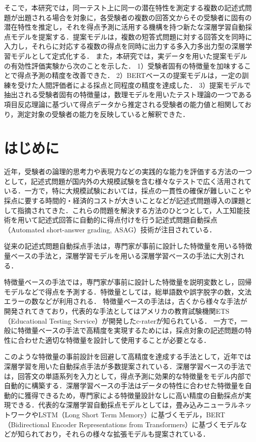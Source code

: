 \documentclass[a4paper,12pt,oneside,openany]{jsbook}
\begin{document}
そこで，本研究では，同一テスト上に同一の潜在特性を測定する複数の記述式問題が出題される場合を対象に，各受験者の複数の回答文からその受験者に固有の潜在特性を推定し，それを得点予測に活用する機構を持つ新たな深層学習自動採点モデルを提案する．提案モデルは，複数の短答式問題に対する回答文を同時に入力し，それらに対応する複数の得点を同時に出力する多入力多出力型の深層学習モデルとして定式化する．
また，本研究では，実データを用いた提案モデルの有効性評価実験から次のことを示した．
1）受験者固有の特徴量を加味することで得点予測の精度を改善できた．
2）BERTベースの提案モデルは，一定の訓練を受けた人間評価者による採点と同程度の精度を達成した．
3）提案モデルで抽出される受験者固有の特徴量は，数理モデルを用いたテスト理論の一つである項目反応理論に基づいて得点データから推定される受験者の能力値と相関しており，測定対象の受験者の能力を反映していると解釈できた．

%
\tableofcontents
%
%
\mainmatter
%
\chapter{はじめに}\label{sec:intro}
近年，受験者の論理的思考力や表現力などの実践的な能力を評価する方法の一つとして，記述式問題が国内外の大規模試験を含む様々なテストで広く活用されている．一方で，特に大規模試験においては，採点の一貫性の確保が難しいことや採点に要する時間的・経済的コストが大きいことなどが記述式問題導入の課題として指摘されてきた．これらの問題を解決する方法のひとつとして，人工知能技術を用いて記述式回答に自動的に得点付けを行う記述式問題自動採点（Automated short-answer grading, ASAG）技術が注目されている．

従来の記述式問題自動採点手法は，専門家が事前に設計した特徴量を用いる特徴量ベースの手法と，深層学習モデルを用いる深層学習ベースの手法に大別される\cite{asag1,asag2,asag3,asag4,asag5}．

特徴量ベースの手法では，専門家が事前に設計した特徴量を説明変数とし，回帰モデルなどで得点を予測する．特徴量としては，総単語数や誤字脱字の数，文法エラーの数などが利用される．
特徴量ベースの手法は，古くから様々な手法が開発されてきており\cite{fearture1,fearture2,fearture7,fearture9}，代表的な手法としてはアメリカの教育試験機関ETS（Educational Testing Service）が開発したc-raterが知られている\cite{fearture9}．
一方で，一般に特徴量ベースの手法で高精度を実現するためには，採点対象の記述問題の特性に合わせた適切な特徴量を設計して使用することが必要となる．

このような特徴量の事前設計を回避して高精度を達成する手法として，近年では深層学習を用いた自動採点手法が多数提案されている\cite{cross-prompt1,cross-prompt2}．深層学習ベースの手法では，回答文の単語系列を入力として，得点予測に効果的な特徴量をモデル内部で自動的に構築する．深層学習ベースの手法はデータの特性に合わせた特徴量を自動的に獲得できるため，専門家による特徴量設計なしに高い精度の自動採点が実現できる．代表的な深層学習自動採点モデルとしては，畳み込みニューラルネットワークやLSTM（Long Short Term Memory）\cite{lstm1,lstm2}に基づくモデル，BERT（Bidirectional Encoder Representations from Transformers）\cite{BERT1,BERT2}に基づくモデルなどが知られており，それらの様々な拡張モデルも提案されている\cite{aes1,SKIPFLOWmodel,self-attention-basedmodel,DNN1,DNN2}．
\end{document}
